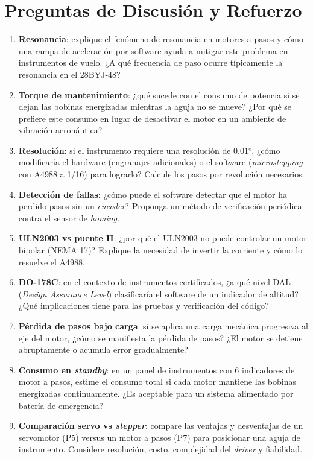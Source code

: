 \documentclass[11pt]{article}
\begin{document}
\section{Preguntas de Discusión y Refuerzo}
\begin{enumerate}
  \item \textbf{Resonancia}: explique el fenómeno de resonancia en motores a pasos y
        cómo una rampa de aceleración por software ayuda a mitigar este problema en
        instrumentos de vuelo. ¿A qué frecuencia de paso ocurre típicamente la
        resonancia en el 28BYJ-48?
  \item \textbf{Torque de mantenimiento}: ¿qué sucede con el consumo de potencia si se
        dejan las bobinas energizadas mientras la aguja no se mueve? ¿Por qué se
        prefiere este consumo en lugar de desactivar el motor en un ambiente de
        vibración aeronáutica?
  \item \textbf{Resolución}: si el instrumento requiere una resolución de
        $0.01\si{\degree}$, ¿cómo modificaría el hardware (engranajes adicionales) o el
        software (\emph{microstepping} con A4988 a 1/16) para lograrlo? Calcule los
        pasos por revolución necesarios.
  \item \textbf{Detección de fallas}: ¿cómo puede el software detectar que el motor ha
        perdido pasos sin un \emph{encoder}? Proponga un método de verificación
        periódica contra el sensor de \emph{homing}.
  \item \textbf{ULN2003 vs puente H}: ¿por qué el ULN2003 no puede controlar un motor
        bipolar (NEMA 17)? Explique la necesidad de invertir la corriente y cómo lo
        resuelve el A4988.
  \item \textbf{DO-178C}: en el contexto de instrumentos certificados, ¿a qué nivel DAL
        (\emph{Design Assurance Level}) clasificaría el software de un indicador de
        altitud? ¿Qué implicaciones tiene para las pruebas y verificación del código?
  \item \textbf{Pérdida de pasos bajo carga}: si se aplica una carga mecánica progresiva
        al eje del motor, ¿cómo se manifiesta la pérdida de pasos? ¿El motor se detiene
        abruptamente o acumula error gradualmente?
  \item \textbf{Consumo en \emph{standby}}: en un panel de instrumentos con 6
        indicadores de motor a pasos, estime el consumo total si cada motor mantiene las
        bobinas energizadas continuamente. ¿Es aceptable para un sistema alimentado por
        batería de emergencia?
  \item \textbf{Comparación servo vs \emph{stepper}}: compare las ventajas y
        desventajas de un servomotor (P5) versus un motor a pasos (P7) para posicionar
        una aguja de instrumento. Considere resolución, costo, complejidad del
        \emph{driver} y fiabilidad.
\end{enumerate}
\end{document}
